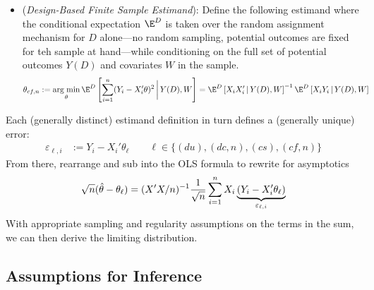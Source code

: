 \documentclass[12pt]{article}
\theoremstyle{plain}
\theoremstyle{definition}
\theoremstyle{remark}
\DeclareMathOperator*{\argmin}{arg\;min}
\newcommand{\sumin}{\sum^n_{i=1}}
\begin{document}
\begin{itemize}
  \item
    (\emph{Design-Based Finite Sample Estimand}):
    Define the following estimand where the conditional expectation
    $\E^D$ is taken over the random assignment mechanism for $D$
    alone---no random sampling, potential outcomes are fixed for teh
    sample at hand---while conditioning on the full set of potential
    outcomes $Y(D)$ and covariates $W$ in the sample.
    \begin{align*}
      \theta_{cf,n}
      &:=
      \argmin_{\theta}
      \E^D\left[
        \sum_{i=1}^n
        (Y_i-X_i'\theta)^2
        \,\bigg|\,Y(D),W
      \right]
      =
      \E^D
      \left[
      {X}_i{X}_i'
      \,|\,
      Y(D),W
      \right]^{-1}
      \E^D
      \left[
      {X}_iY_i
      \,|\,
      Y(D),W
      \right]
    \end{align*}
\end{itemize}
Each (generally distinct) estimand definition in turn defines a
(generally unique) error:
\begin{align*}
  \varepsilon_{\ell,i}
  &:=
  Y_i-X_i'\theta_{\ell}
  \qquad
  \ell\in\{(du), (dc,n), (cs), (cf,n)\}
\end{align*}
From there, rearrange and sub into the OLS formula to
rewrite for asymptotics
\begin{align*}
  \sqrt{n}
  (
  \hat{\theta}
  -
  \theta_{\ell}
  )
  =
  (X'X/n)^{-1}
  \frac{1}{\sqrt{n}}
  \sumin
  X_i
  \underbrace{%
    (Y_i-X_i'\theta_{\ell})
  }_{\varepsilon_{\ell,i}}
\end{align*}
With appropriate sampling and regularity assumptions on the terms in the
sum, we can then derive the limiting distribution.


\clearpage
\subsection{Assumptions for Inference}
\end{document}
